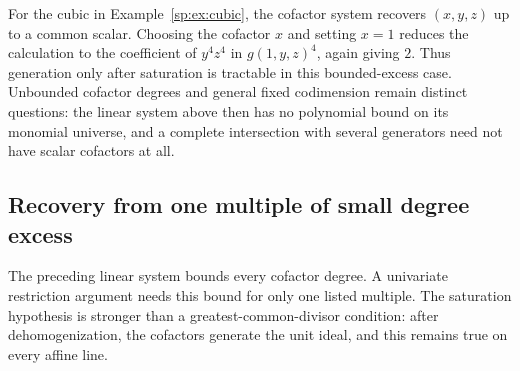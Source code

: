 For the cubic in Example~\ref{sp:ex:cubic}, the cofactor system recovers
$(x,y,z)$ up to a common scalar. Choosing the cofactor $x$ and setting
$x=1$ reduces the calculation to the coefficient of $y^4z^4$ in
$g(1,y,z)^4$, again giving $2$. Thus generation only after saturation
is tractable in this bounded-excess case. Unbounded cofactor degrees
and general fixed codimension remain distinct questions: the linear
system above then has no polynomial bound on its monomial universe,
and a complete intersection with several generators need not have
scalar cofactors at all.

\subsection{Recovery from one multiple of small degree excess}
The preceding linear system bounds every cofactor degree. A univariate
restriction argument needs this bound for only one listed multiple.
The saturation hypothesis is stronger than a greatest-common-divisor
condition: after dehomogenization, the cofactors generate the unit ideal,
and this remains true on every affine line.

